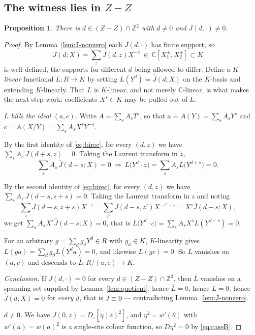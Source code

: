 \documentclass[11pt,reqno]{amsart}
\theoremstyle{plain}
\newtheorem{prop}[thm]{Proposition}
\theoremstyle{definition}
\theoremstyle{remark}
\theoremstyle{plain}
\theoremstyle{remark}
\theoremstyle{definition}
\numberwithin{equation}{section}
\newcommand{\Z}{\mathbb{Z}}
\newcommand{\C}{\mathbb{C}}
\begin{document}
\subsection{The witness lies in
\texorpdfstring{$Z-Z$}{Z-Z}}\label{ssec:witness}

\begin{prop}\label{prop:witness}
There is $d\in(Z-Z)\cap\Z^2$ with $d\ne0$ and $J(d,\cdot)\ne0$.
\end{prop}

\begin{proof}
By Lemma~\ref{lem:J-nonzero} each $J(d,\cdot)$ has finite support, so
\[\widehat J(d;X)=\sum_zJ(d,z)X^{-z}\ \in\ \C[X_1^{\pm},X_2^{\pm}]\subset K\]
is well defined, the supports for different $d$ being allowed to differ.  Define
a \emph{$K$-linear} functional $L\colon R\to K$ by setting
$L(Y^d)=\widehat J(d;X)$ on the $K$-basis and extending $K$-linearly.  That $L$
is $K$-linear, and not merely $\C$-linear, is what makes the next step work:
coefficients $X^s\in K$ may be pulled out of $L$.

\smallskip\noindent\emph{$L$ kills the ideal $(a,c)$.}  Write $A=\sum_sA_sT^s$,
so that $a=A(Y)=\sum_sA_sY^s$ and $c=A(X/Y)=\sum_sA_sX^sY^{-s}$.

By the first identity of \eqref{eq:birec}, for every $(d,z)$ we have
$\sum_sA_s\,J(d+s,z)=0$.  Taking the Laurent transform in $z$,
\[\sum_sA_s\,\widehat J(d+s;X)=0
  \ \Longrightarrow\ L\bigl(Y^{d}\cdot a\bigr)=\sum_sA_sL\bigl(Y^{d+s}\bigr)=0 .\]

By the second identity of \eqref{eq:birec}, for every $(d,z)$ we have
$\sum_sA_s\,J(d-s,z+s)=0$.  Taking the Laurent transform in $z$ and noting
\[\sum_zJ(d-s,z+s)X^{-z}=\sum_{z'}J(d-s,z')X^{-z'+s}=X^{s}\widehat J(d-s;X),\]
we get $\sum_sA_sX^s\widehat J(d-s;X)=0$, that is
$L\bigl(Y^d\cdot c\bigr)=\sum_sA_sX^sL(Y^{d-s})=0$.

For an arbitrary $g=\sum_dg_dY^d\in R$ with $g_d\in K$, $K$-linearity gives
$L(ga)=\sum_dg_dL(Y^da)=0$, and likewise $L(gc)=0$.  So $L$ vanishes on
$(a,c)$ and descends to $\bar L\colon R/(a,c)\to K$.

\smallskip\noindent\emph{Conclusion.}  If $J(d,\cdot)=0$ for every
$d\in(Z-Z)\cap\Z^2$, then $\bar L$ vanishes on a spanning set supplied by
Lemma~\ref{lem:quotient}, hence $\bar L=0$, hence $L=0$, hence
$\widehat J(d;X)=0$ for \emph{every} $d$, that is $J\equiv0$ — contradicting
Lemma~\ref{lem:J-nonzero}.

\smallskip\noindent\emph{$d\ne0$.}  We have $J(0,z)=D_z[\eta(z)^2]$, and
$\eta^2=w'(\theta)$ with $w'(a)=w(a)^2$ is a single-site colour function, so
$D\eta^2=0$ by \eqref{eq:caseB}.
\end{proof}
\end{document}
